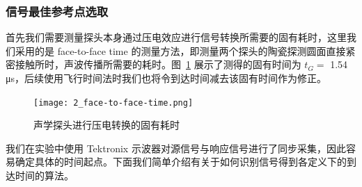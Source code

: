 \subsubsection{信号最佳参考点选取}

首先我们需要测量探头本身通过压电效应进行信号转换所需要的固有耗时，这里我们采用的是 face-to-face time 的测量方法，即测量两个探头的陶瓷探测圆面直接紧密接触所时，声波传播所需要的耗时。图~\ref{fig:face-to-face_time} 展示了测得的固有时间为 $t_{G} = $ 1.54 \unit{\micro\second}，后续使用飞行时间法时我们也将令到达时间减去该固有时间作为修正。

\begin{figure}[!htp]
  \centering
  \texttt{[image: 2\_face-to-face-time.png]}
  \caption{声学探头进行压电转换的固有耗时}%
  \label{fig:face-to-face_time}
\end{figure}

我们在实验中使用 Tektronix 示波器对源信号与响应信号进行了同步采集，因此容易确定具体的时间起点。下面我们简单介绍有关于如何识别信号得到各定义下的到达时间的算法。

